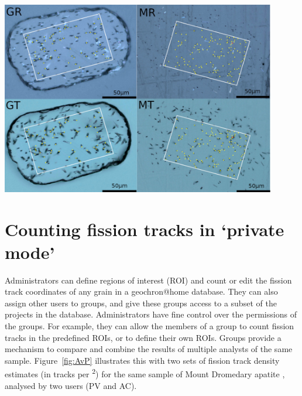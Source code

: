 \documentclass[gchron, manuscript]{copernicus}
\begin{document}
{ \centering \includegraphics[width=12cm]{EDM.jpg}
  \label{fig:EDM}
}%

\section{Counting fission tracks in `private mode'}\label{sec:private}

Administrators can define regions of interest (ROI) and count or edit
the fission track coordinates of any grain in a geochron@home
database. They can also assign other users to groups, and give these
groups access to a subset of the projects in the
database. Administrators have fine control over the permissions of the
groups. For example, they can allow the members of a group to count
fission tracks in the predefined ROIs, or to define their own
ROIs. Groups provide a mechanism to compare and combine the results of
multiple analysts of the same sample. Figure~\ref{fig:AvP} illustrates
this with two sets of fission track density estimates (in tracks per
\textsuperscript{2}) for the same sample of Mount Dromedary
apatite \citep{green1985b}, analysed by two users (PV and AC).\medskip
\end{document}
